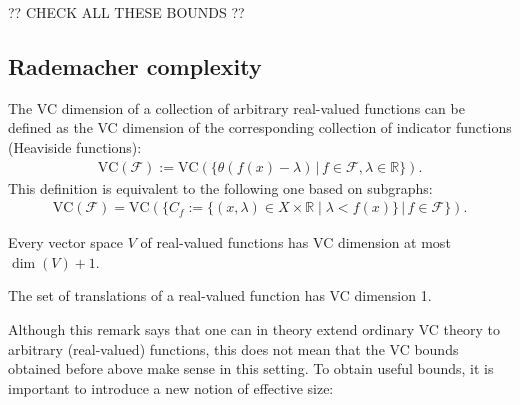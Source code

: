     ?? CHECK ALL THESE BOUNDS ??

\subsection{Rademacher complexity}

    \begin{remark}
        The VC dimension of a collection of arbitrary real-valued functions can be defined as the VC dimension of the corresponding collection of indicator functions (Heaviside functions):
        \begin{gather}
            \mathrm{VC}(\mathcal{F}) := \mathrm{VC}\left(\big\{\theta(f(x)-\lambda)\,\big\vert\,f\in\mathcal{F},\lambda\in\mathbb{R}\big\}\right).
        \end{gather}
        This definition is equivalent to the following one based on subgraphs:
        \begin{gather}
            \mathrm{VC}(\mathcal{F}) = \mathrm{VC}\left(\big\{C_f:=\{(x,\lambda)\in X\times\mathbb{R}\mid\lambda<f(x)\}\,\big\vert\,f\in\mathcal{F}\big\}\right).
        \end{gather}
    \end{remark}

    \begin{example}
        Every vector space $V$ of real-valued functions has VC dimension at most $\dim(V)+1$.
    \end{example}
    \begin{example}[Translations]
        The set of translations of a real-valued function has VC dimension 1.
    \end{example}

    Although this remark says that one can in theory extend ordinary VC theory to arbitrary (real-valued) functions, this does not mean that the VC bounds obtained before above make sense in this setting. To obtain useful bounds, it is important to introduce a new notion of effective size:

